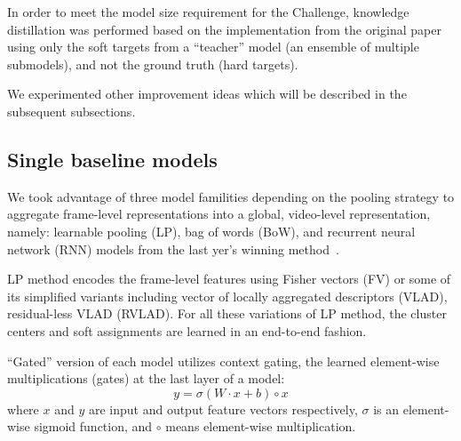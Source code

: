 \documentclass[runningheads]{llncs}
\begin{document}
In order to meet the model size requirement for the Challenge, knowledge distillation was performed based on the implementation from the original paper~\cite{hinton2014} using only the soft targets from a ``teacher'' model (an ensemble of multiple submodels), and not the ground truth (hard targets).

We experimented other improvement ideas which will be described in the subsequent subsections.

\subsection{Single baseline models}
We took advantage of three model familities depending on the pooling strategy to aggregate frame-level representations into a global, video-level representation, namely: learnable pooling (LP), bag of words (BoW), and recurrent neural network (RNN) models from the last yer's winning method~\cite{miech2017}.

LP method encodes the frame-level features using Fisher vectors (FV) or some of its simplified variants including vector of locally aggregated descriptors (VLAD), residual-less VLAD (RVLAD).
For all these variations of LP method, the cluster centers and soft assignments are learned in an end-to-end fashion.

``Gated'' version of each model utilizes context gating, the learned element-wise multiplications (gates) at the last layer of a model:
\begin{equation}
y = \sigma (W \cdot x + b) \circ x
\end{equation}
where $x$ and $y$ are input and output feature vectors respectively, $\sigma$ is an element-wise sigmoid function, and $\circ$ means element-wise multiplication.
\end{document}
